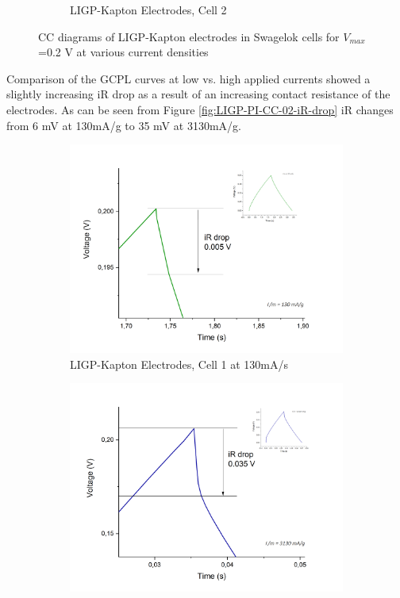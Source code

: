 \begin{figure}[H]
\begin{subfigure}{0.49\textwidth}
\captionsetup{width=0.9\linewidth}
\caption{LIGP-Kapton Electrodes, Cell 2}
\label{fig:LIGP-PI-cell2-CC-02}
\end{subfigure}
\medskip
\caption{CC diagrams of LIGP-Kapton electrodes in Swagelok cells for $V_{max}$=0.2 V at various current densities}
\label{fig:LIGP-PI-CC-02}
\end{figure}

Comparison of the GCPL curves at low vs. high applied currents showed a slightly increasing iR drop as a result of an increasing contact resistance of the electrodes. As can be seen from Figure \ref{fig:LIGP-PI-CC-02-iR-drop} iR changes from 6 mV at 130\:mA/g to 35 mV at 3130\:mA/g. 

\begin{figure}[H]
\begin{subfigure}{0.49\textwidth}
\includegraphics[width=1\textwidth]{Figures/Results/Electrochemistry/LIGP-PI-NaNO3-Swagelok/Cell1/GCPL_Vmax02_cell1_130mA-g-inset.jpg} 
\captionsetup{width=0.9\linewidth}
\caption{LIGP-Kapton Electrodes, Cell 1 at 130\:mA/s}
\label{fig:LIG-PI-cell1-CC-02-iR-low}
\end{subfigure}
\begin{subfigure}{0.49\textwidth}
\includegraphics[width=1\textwidth]{Figures/Results/Electrochemistry/LIGP-PI-NaNO3-Swagelok/Cell1/GCPL_Vmax02_cell1_1130mA-g-inset.jpg}

\end{subfigure}
\end{figure}
